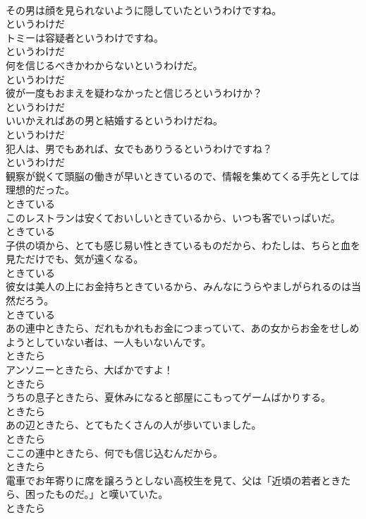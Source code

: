 \documentclass[8pt]{extreport}
\begin{document}
\begin{CJK}{UTF8}{min}
\\	その男は顔を見られないように隠していたというわけですね。	
\\	というわけだ	
\\	トミーは容疑者というわけですね。	
\\	というわけだ	
\\	何を信じるべきかわからないというわけだ。	
\\	というわけだ	
\\	彼が一度もおまえを疑わなかったと信じろというわけか？	
\\	というわけだ	
\\	いいかえればあの男と結婚するというわけだね。	
\\	というわけだ	
\\	犯人は、男でもあれば、女でもありうるというわけですね？	
\\	というわけだ	
\\	観察が鋭くて頭脳の働きが早いときているので、情報を集めてくる手先としては理想的だった。	
\\	ときている	
\\	このレストランは安くておいしいときているから、いつも客でいっぱいだ。	
\\	ときている	
\\	子供の頃から、とても感じ易い性ときているものだから、わたしは、ちらと血を見ただけでも、気が遠くなる。	
\\	ときている	
\\	彼女は美人の上にお金持ちときているから、みんなにうらやましがられるのは当然だろう。	
\\	ときている	
\\	あの連中ときたら、だれもかれもお金につまっていて、あの女からお金をせしめようとしていない者は、一人もいないんです。	
\\	ときたら	
\\	アンソニーときたら、大ばかですよ！	
\\	ときたら	
\\	うちの息子ときたら、夏休みになると部屋にこもってゲームばかりする。	
\\	ときたら	
\\	あの辺ときたら、とてもたくさんの人が歩いていました。	
\\	ときたら	
\\	ここの連中ときたら、何でも信じ込むんだから。	
\\	ときたら	
\\	電車でお年寄りに席を譲ろうとしない高校生を見て、父は「近頃の若者ときたら、困ったものだ。」と嘆いていた。	
\\	ときたら	

\end{CJK}
\end{document}

